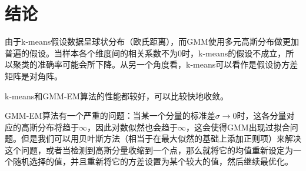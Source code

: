 \section{结论}

由于k-means假设数据呈球状分布（欧氏距离），而GMM使用多元高斯分布做更加普遍的假设。当样本各个维度间的相关系数不为0时，k-means的假设不成立，所以聚类的准确率可能会所下降。从另一个角度看，k-means可以看作是假设协方差矩阵是对角阵。

k-means和GMM-EM算法的性能都较好，可以比较快地收敛。

GMM-EM算法有一个严重的问题：当某一个分量的标准差$\sigma\rightarrow 0$时，这各分量对应的高斯分布将趋于$\infty$，因此对数似然也会趋于$\infty$，这会使得GMM出现过拟合问题。但是我们可以用贝叶斯方法（相当于在最大似然的基础上添加正则项）来解决这个问题，或者当检测到⾼斯分量收缩到⼀个点，那么就将它的均值重新设定为⼀个随机选择的值，并且重新将它的⽅差设置为某个较⼤的值，然后继续最优化\cite{PRML}。
